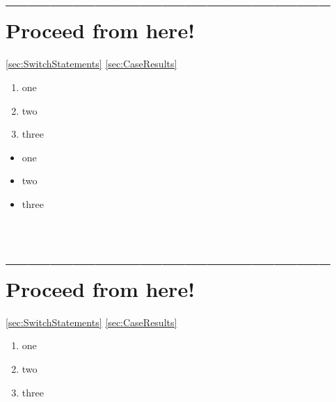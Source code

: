 \section{-------------------------------------------- Proceed from here!}
\ref{sec:SwitchStatements}
\ref{sec:CaseResults}
\autocite{ORACLE_DOC_PATTERNMATCHING}

\autocite{ORACLE_DOC_LANGUAGE_SPECIFICATION:SwitchExpression, ORACLE_DOC_LANGUAGE_SPECIFICATION:SwitchExpressionBlock, ORACLE_DOC_SWITCHEXPRESSIONS}



\lipsum[1]

\begin{enumerate}[label=P\arabic*.]
\item{one}
\item{two}
\item{three}
\end{enumerate}

\begin{itemize}[nosep]
\item{one}
\item{two}
\item{three}
\end{itemize}

\begin{lstlisting}[numbers=left]
\end{lstlisting}

\hrulefill\newpage 
\section{-------------------------------------------- Proceed from here!}
\ref{sec:SwitchStatements}
\ref{sec:CaseResults}
\autocite{ORACLE_DOC_PATTERNMATCHING}
\autocite{ORACLE_DOC_SWITCHEXPRESSIONS}

\autocite{ORACLE_DOC_LANGUAGE_SPECIFICATION:SwitchExpression}
\autocite{ORACLE_DOC_LANGUAGE_SPECIFICATION:SwitchExpressionBlock}





\lipsum[1]

\begin{enumerate}[label=P\arabic*.]
\item{one}
\item{two}
\item{three}
\end{enumerate}


